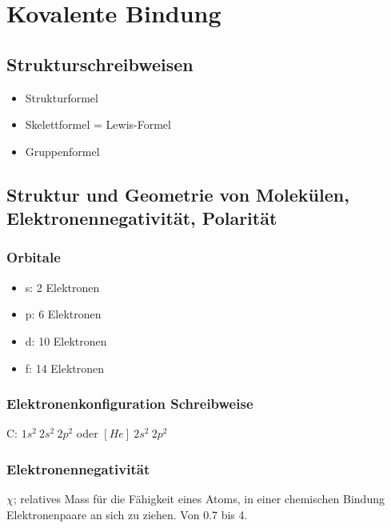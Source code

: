 \section{Kovalente Bindung}

\subsection{Strukturschreibweisen}

\begin{itemize}
	\item Strukturformel
	\item Skelettformel = Lewis-Formel
	\item Gruppenformel
\end{itemize}

\subsection{Struktur und Geometrie von Molekülen, Elektronennegativität, Polarität}

\subsubsection{Orbitale}

\begin{itemize}
	\item s: 2 Elektronen
	\item p: 6 Elektronen
	\item d: 10 Elektronen
	\item f: 14 Elektronen
\end{itemize}

\subsubsection{Elektronenkonfiguration Schreibweise}

C: $1s^2 \ 2s^2 \ 2p^2$ oder $[He] \ 2s^2 \ 2p^2$

\subsubsection{Elektronennegativität}

\begin{definition}[Elektronennegativität]
	$\chi$; relatives Mass für die Fähigkeit eines Atoms, in einer chemischen Bindung Elektronenpaare an sich zu ziehen. Von 0.7 bis 4.
\end{definition}


